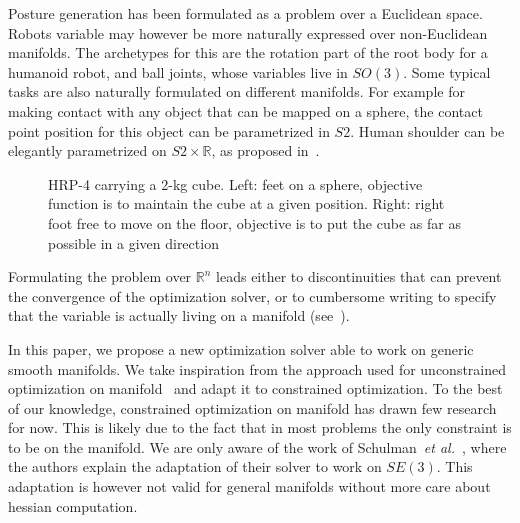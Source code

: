 Posture generation has been formulated as a problem over a Euclidean space. Robots variable may however be more naturally expressed over non-Euclidean manifolds. The archetypes for this are the rotation part of the root body for a humanoid robot, and ball joints, whose variables live in $SO(3)$. Some typical tasks are also naturally formulated on different manifolds. For example for making contact with any object that can be mapped on a sphere, the contact point position for this object can be parametrized in $S2$. Human shoulder can be elegantly parametrized on $S2\times\mathbb{R}$, as proposed in~\cite{Baerlocher}.

\begin{figure}[!tb]
\centering
  \centering
  \setlength\fboxsep{0pt}
  \setlength\fboxrule{1pt}
\caption{HRP-4 carrying a 2-kg cube. Left: feet on a sphere, objective function is to maintain the cube at a given position. Right: right foot free to move on the floor, objective is to put the cube as far as possible in a given direction}
\label{fig:hrp4_cube}
\end{figure}

Formulating the problem over $\mathbb{R}^n$ leads either to discontinuities that can prevent the convergence of the optimization solver, or to cumbersome writing to specify that the variable is actually living on a manifold (see~\cite{bouyarmane:humanoids:2012}).

In this paper, we propose a new optimization solver able to work on generic smooth manifolds. We take inspiration from the approach used for unconstrained optimization on manifold~\cite{absil:book:2008} and adapt it to constrained optimization. To the best of our knowledge, constrained optimization on manifold has drawn few research for now. This is likely due to the fact that in most problems the only constraint is to be on the manifold. We are only aware of the work of Schulman~\emph{et al.}~\cite{Schulman2014}, where the authors explain the adaptation of their solver to work on $SE(3)$. This adaptation is however not valid for general manifolds without more care about hessian computation.

